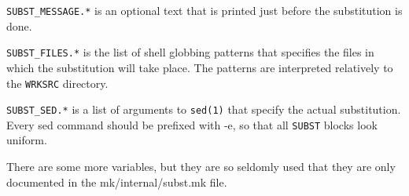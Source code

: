{\tt  SUBST\_MESSAGE.*} is an  optional text  that is  printed just  before the
substitution is  done.

{\tt SUBST\_FILES.*} is the list  of shell globbing patterns that specifies the
files in which the substitution  will take place.  The patterns are interpreted
relatively  to the {\tt WRKSRC}  directory.

{\tt SUBST\_SED.*}  is a  list of  arguments to {\tt  sed(1)} that  specify the
actual substitution.  Every sed command should be prefixed with -e, so that all
{\tt SUBST} blocks look uniform.

There are some more variables, but they are so seldomly used that they are only
documented in the mk/internal/subst.mk file.
